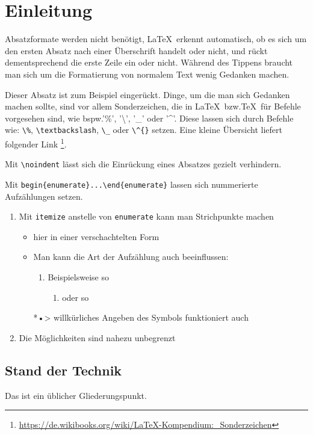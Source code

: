 \chapter{Einleitung}
\begingroup
\color{blue}
Absatzformate werden nicht benötigt, \LaTeX\ erkennt automatisch, ob es sich um
den ersten Absatz nach einer Überschrift handelt oder nicht, und rückt
dementsprechend die erste Zeile ein oder nicht. Während des Tippens braucht man
sich um die Formatierung von normalem Text wenig Gedanken machen.

Dieser Absatz ist zum Beispiel eingerückt. Dinge, um die man sich Gedanken
machen sollte, sind vor allem Sonderzeichen, die in \LaTeX\ bzw.\@ \TeX\ für
Befehle vorgesehen sind, wie bspw.\@ '\%', '\textbackslash', '\_' oder
'\^{}'. Diese lassen sich durch Befehle wie: \verb|\%|, \verb|\textbackslash|,
\verb|\_| oder \verb|\^{}| setzen. Eine kleine Übersicht liefert folgender Link%
\footnote{\url{https://de.wikibooks.org/wiki/LaTeX-Kompendium:_Sonderzeichen}}.

\noindent
Mit \verb|\noindent| lässt sich die Einrückung eines Absatzes gezielt
verhindern.

Mit \verb|begin{enumerate}...\end{enumerate}| lassen sich nummerierte
Aufzählungen setzen.
\begin{enumerate}
  \item Mit \verb|itemize| anstelle von \verb|enumerate| kann man Strichpunkte
    machen
    \begin{itemize}
      \item hier in einer verschachtelten Form
      \item Man kann die Art der Aufzählung auch beeinflussen:
        \begin{enumerate}[label=\alph*)]
          \item Beispielsweise so
            \begin{enumerate}[label=(\roman*)]
              \item oder so
            \end{enumerate}
        \end{enumerate}
      \item[*•>] willkürliches Angeben des Symbols funktioniert auch
    \end{itemize}
  \item Die Möglichkeiten sind nahezu unbegrenzt
\end{enumerate}

\section{Stand der Technik}
Das ist ein üblicher Gliederungspunkt.

